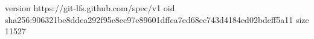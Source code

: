 version https://git-lfs.github.com/spec/v1
oid sha256:906321be8ddea292f95c8ec97e89601dffca7ed68ec743d4184ed02bdeff5a11
size 11527
